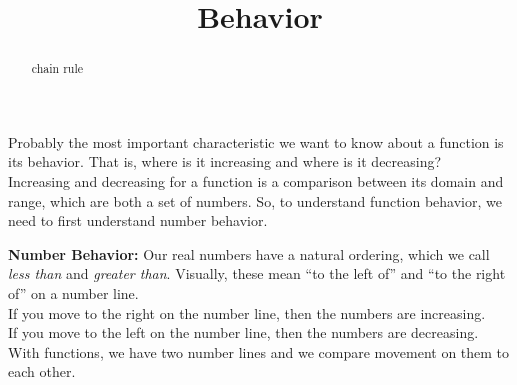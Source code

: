 \documentclass{ximera}
\title{Behavior}
\begin{document}
\begin{abstract}
chain rule
\end{abstract}
\maketitle



Probably the most important characteristic we want to know about a function is its behavior.  That is, where is it increasing and where is it decreasing? \\




Increasing and decreasing for a function is a comparison between its domain and range, which are both a set of numbers.  So, to understand function behavior, we need to first understand number behavior.



\textbf{\textcolor{blue!55!black}{Number Behavior:}}  Our real numbers have a natural ordering, which we call \textit{less than} and \textit{greater than}.  Visually, these mean ``to the left of'' and ``to the right of'' on a number line. \\

If you move to the right on the number line, then the numbers are increasing. \\

If you move to the left on the number line, then the numbers are decreasing. \\











With functions, we have two number lines and we compare movement on them to each other. \\
\end{document}
